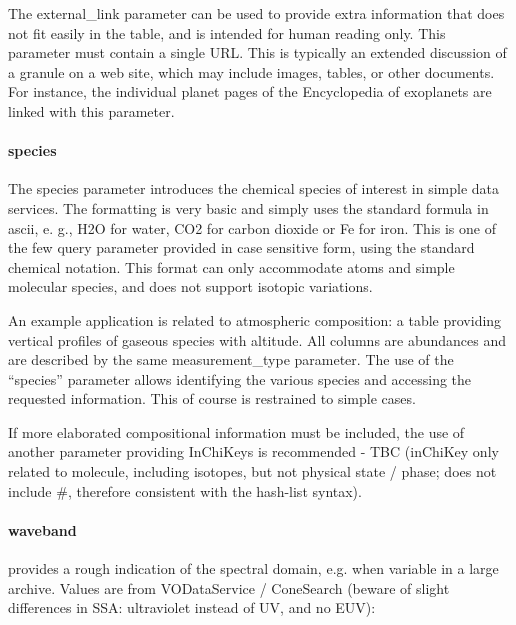 \documentclass[11pt,a4paper]{ivoa}
\begin{document}
The external\_link parameter can be used to provide extra information that does not fit easily in the table, and is intended for human reading only. This parameter must contain a single URL. This is typically an extended discussion of a granule on a web site, which may include images, tables, or other documents. For instance, the individual planet pages of the Encyclopedia of exoplanets are linked with this parameter.\\

\paragraph{species}

The species parameter introduces the chemical species of interest in simple data services. The formatting is very basic and simply uses the standard formula in ascii, e. g., H2O for water, CO2 for carbon dioxide or Fe for iron. This is one of the few query parameter provided in case sensitive form, using the standard chemical notation. This format can only accommodate atoms and simple molecular species, and does not support isotopic variations.  

An example application is related to atmospheric composition: a table providing vertical profiles of gaseous species with altitude. All columns are abundances and are described by the same measurement\_type parameter. The use of the ``species'' parameter allows identifying the various species and accessing the requested information. This of course is restrained to simple cases.

If more elaborated compositional information must be included, the use of another parameter providing InChiKeys is recommended - TBC (inChiKey only related to molecule, including isotopes, but not physical state / phase; does not include \#, therefore consistent with the hash-list syntax).\\

\paragraph{waveband}

provides a rough indication of the spectral domain, e.g. when variable in a large archive. Values are from VODataService / ConeSearch (beware of slight differences in SSA: ultraviolet instead of UV, and no EUV): 
\end{document}
